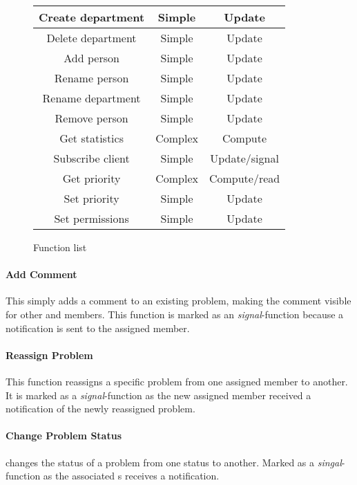 \begin{figure}[h]
\begin{center}
\begin{tabular}{|c|c|c|}
Create department & Simple & Update \\ \hline%
Delete department & Simple & Update \\ \hline%
Add person & Simple & Update \\ \hline%
Rename person & Simple & Update \\ \hline%
Rename department & Simple & Update \\ \hline%
Remove person & Simple & Update \\ \hline%
Get statistics & Complex & Compute \\ \hline%
Subscribe client & Simple & Update/signal \\ \hline%
Get priority & Complex & Compute/read \\ \hline%
Set priority & Simple & Update \\ \hline%
Set permissions & Simple & Update \\ \hline%

\end{tabular}
\end{center}
\caption{Function list}
\label{tab:functionlist}
\end{figure}


\paragraph{Add Comment} This simply adds a comment to an existing problem, making the comment visible for other \client{} and \astaff[] members. This function is marked as an \textit{signal}-function because a notification is sent to the assigned \astaff[] member.

\paragraph{Reassign Problem} This function reassigns a specific problem from one assigned \astaff[] member to another. It is marked as a \textit{signal}-function as the new assigned \astaff[] member received a notification of the newly reassigned problem. 

\paragraph{Change Problem Status} changes the status of a problem from one status to another. Marked as a \textit{singal}-function as the associated \client s receives a notification. 

